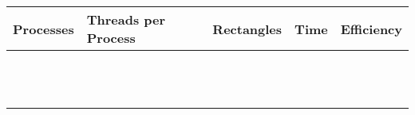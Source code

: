 \begin{table}[H]
\centering
\label{worksheetTable}
\begin{tabu} to \textwidth { | X[cm] | X[cm] | X[cm] | X[cm] | X[cm] | }
\hline
\textbf{Processes} & \textbf{Threads per Process} & \textbf{Rectangles} & \textbf{Time} & \textbf{Efficiency} \\ \hline
                   &                              &                     &               &                     \\ \hline
                   &                              &                     &               &                     \\ \hline
                   &                              &                     &               &                     \\ \hline
                   &                              &                     &               &                     \\ \hline
                   &                              &                     &               &                     \\ \hline
                   &                              &                     &               &                     \\ \hline
                   &                              &                     &               &                     \\ \hline
                   &                              &                     &               &                     \\ \hline
                   &                              &                     &               &                     \\ \hline
                   &                              &                     &               &                     \\ \hline
                   &                              &                     &               &                     \\ \hline
                   &                              &                     &               &                     \\ \hline
\end{tabu}
\end{table}

\bigskip
